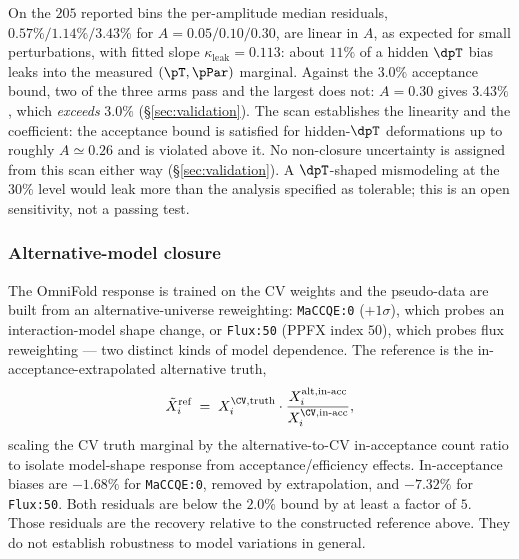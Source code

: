 On the $205$ reported bins the per-amplitude median residuals, $0.57\% / 1.14\% / 3.43\%$ for $A = 0.05/0.10/0.30$, are linear in $A$, as expected for small perturbations, with fitted slope $\kappa_{\text{leak}} = \boxed{0.113}$: about $11\%$ of a hidden $\dpT$ bias leaks into the measured $(\pT,\pPar)$ marginal. Against the $3.0\%$ acceptance bound, two of the three arms pass and the largest does not: $A=0.30$ gives $3.43\%$, which \emph{exceeds} $3.0\%$ (\S\ref{sec:validation}). The scan establishes the linearity and the coefficient: the acceptance bound is satisfied for hidden-$\dpT$ deformations up to roughly $A\simeq0.26$ and is violated above it. No non-closure uncertainty is assigned from this scan either way (\S\ref{sec:validation}). A $\dpT$-shaped mismodeling at the $30\%$ level would leak more than the analysis specified as tolerable; this is an open sensitivity, not a passing test.

\subsubsection{Alternative-model closure}
\label{sec:closure-alt}
The OmniFold response is trained on the CV weights and the pseudo-data are built from an alternative-universe reweighting: \texttt{MaCCQE:0} ($+1\sigma$), which probes an interaction-model shape change, or \texttt{Flux:50} (PPFX index $50$), which probes flux reweighting --- two distinct kinds of model dependence. The reference is the in-acceptance-extrapolated alternative truth,
\begin{equation}
\tilde X^{\text{ref}}_{i}
\;=\;
X^{\CV,\text{truth}}_{i}\cdot
\frac{X^{\text{alt},\text{in-acc}}_{i}}{X^{\CV,\text{in-acc}}_{i}},
\end{equation}
scaling the CV truth marginal by the alternative-to-CV in-acceptance count ratio to isolate model-shape response from acceptance/efficiency effects. In-acceptance biases are $-1.68\%$ for \texttt{MaCCQE:0}, removed by extrapolation, and $-7.32\%$ for \texttt{Flux:50}. Both residuals are below the $2.0\%$ bound by at least a factor of $5$. Those residuals are the recovery relative to the constructed reference above. They do not establish robustness to model variations in general.

